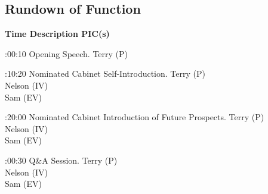 \subsection{Rundown of Function}

\setupTABLE[c][1][width=1.25in]
\setupTABLE[c][2][width=3.5in]
\setupTABLE[c][3][width=1.25in]
\bTABLE
\bTABLEhead

\bTR\bTH    \bf{Time}
\eTH\bTH    \bf{Description}
\eTH\bTH    \bf{PIC(s)}
\eTH\eTR

\eTABLEhead
\bTABLEbody

\bTR{}:00:10
\eTD\bTD Opening Speech.
\eTD\bTD Terry (P)
\eTD\eTR

\bTR{}:10:20
\eTD\bTD Nominated Cabinet Self-Introduction.
\eTD\bTD Terry (P) \\ Nelson (IV) \\ Sam (EV)
\eTD\eTR

\bTR{}:20:00
\eTD\bTD Nominated Cabinet Introduction of Future Prospects.
\eTD\bTD Terry (P) \\ Nelson (IV) \\ Sam (EV)
\eTD\eTR

\bTR{}:00:30
\eTD\bTD Q\&A Session.
\eTD\bTD Terry (P) \\ Nelson (IV) \\ Sam (EV)
\eTD\eTR

\eTABLEbody
\eTABLE

\stopsection
\pagebreak
